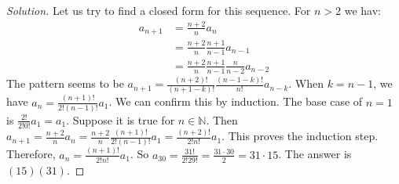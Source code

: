 \documentclass[crop=false,class=article,oneside]{standalone}
\begin{document}
        \begin{proof}[Solution]
            Let us try to find a closed form for this sequence. For $n>2$ we hav:
            \begin{align*}
                a_{n+1} &= \frac{n+2}{n}a_n \\
                &= \frac{n+2}{n}\frac{n+1}{n-1}a_{n-1}\\
                &= \frac{n+2}{n}\frac{n+1}{n-1}\frac{n}{n-2}a_{n-2}
            \end{align*}
            The pattern seems to be $a_{n+1} = \frac{(n+2)!}{(n+1-k)!}\frac{(n-1-k)!}{n!}a_{n-k}$. When $k=n-1$, we have $a_{n} = \frac{(n+1)!}{2!(n-1)!}a_1$. We can confirm this by induction. The base case of $n=1$ is $\frac{2!}{2!0!}a_1 = a_1$. Suppose it is true for $n\in \mathbb{N}$. Then $a_{n+1} = \frac{n+2}{n} a_n = \frac{n+2}{n} \frac{(n+1)!}{2!(n-1)!}a_1 = \frac{(n+2)!}{2!n!}a_1$. This proves the induction step. Therefore, $a_n = \frac{(n+1)!}{2!n!}a_1$. So $a_{30} = \frac{31!}{2!29!} = \frac{31\cdot 30}{2} = 31\cdot 15$. The answer is $(15)(31)$.
            \end{proof}
\end{document}
